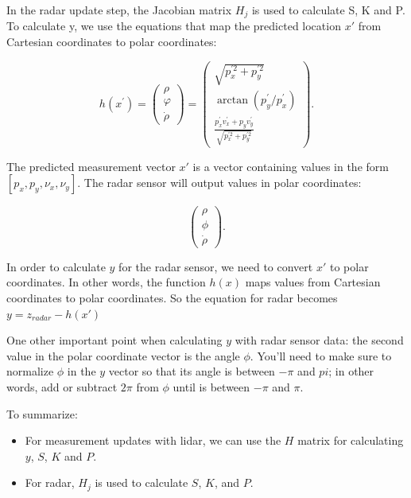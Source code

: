 \documentclass[11pt, a4paper]{article}
\begin{document}
In the radar update step, the Jacobian matrix $H_j$ is used to calculate S, K and P. To calculate y, we use the equations that map the predicted location $x'$ from Cartesian coordinates to polar coordinates:


\[
	h\left(x^{\prime}\right)=\left(\begin{array}{c}{\rho} \\ {\varphi} \\ {\dot{\rho}}\end{array}\right)= \left(\begin{array}{c}{\sqrt{p_{x}^{\prime 2}+p^{\prime2}_{y}}} \\ 
	{\operatorname{arctan}\left(p_{y}^{\prime} / p_{x}^{\prime}\right)} \\ 
{\frac{p_{x}^{\prime} v_{x}^{\prime}+p_{y} v_{y}^{\prime}}{\sqrt{p_{x}^{\prime2}+p_{y}^{\prime2}}}}\end{array}\right)
.\] 




The predicted measurement vector $x'$ is a vector containing values in the form $[p_x, p_y, \nu_x, \nu_y]$. The radar sensor will output values in polar coordinates:

\[
\left(\begin{array}{l}{\rho} \\ {\phi} \\ {\dot{\rho}}\end{array}\right)
.\] 

In order to calculate $y$ for the radar sensor, we need to convert $x'$ to polar coordinates. In other words, the function $h(x)$ maps values from Cartesian coordinates to polar coordinates. So the equation for radar becomes $y = z_{radar} - h(x')$



One other important point when calculating $y$ with radar sensor data: the second value in the polar coordinate vector is the angle $\phi$. You'll need to make sure to normalize $\phi$ in the $y$ vector so that its angle is between $-\pi$ and $pi$; in other words, add or subtract $2\pi$ from $\phi$ until is between $-\pi$ and $\pi$.

To summarize:

\begin{itemize}
	\item For measurement updates with lidar, we can use the $H$ matrix for calculating $y$, $S$, $K$ and $P$.
	\item For radar, $H_j$ is used to calculate $S$, $K$, and $P$.
\end{itemize}
\end{document}

